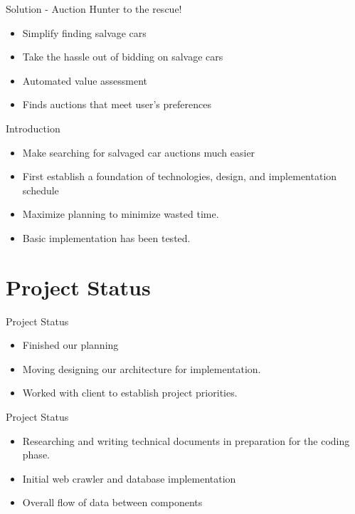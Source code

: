 \documentclass{beamer}
\begin{document}

\begin{frame}{Solution - Auction Hunter to the rescue!}
\begin{itemize}
    \setlength\itemsep{2em}
    \item Simplify finding salvage cars
    \item Take the hassle out of bidding on salvage cars
    \item Automated value assessment
    \item Finds auctions that meet user's preferences
\end{itemize}
\end{frame}

\begin{frame}{Introduction}
\begin{itemize}
  \setlength\itemsep{2em}
  \item Make searching for salvaged car auctions much easier
  \item First establish a foundation of technologies, design, and implementation schedule
  \item Maximize planning to minimize wasted time. 
  \item Basic implementation has been tested. 
\end{itemize}

\end{frame}

\section{Project Status}
\begin{frame}{Project Status}

\begin{itemize}
\setlength\itemsep{2em}
\item Finished our planning

\item Moving designing our architecture for implementation.

\item Worked with client to establish project priorities. 
\end{itemize}

\end{frame}

\begin{frame}{Project Status}

\begin{itemize}
\setlength\itemsep{2em}
\item Researching and writing technical documents in preparation for the coding phase.
\item Initial web crawler and database implementation
\item Overall flow of data between components

\end{itemize}

\end{frame}
\end{document}
